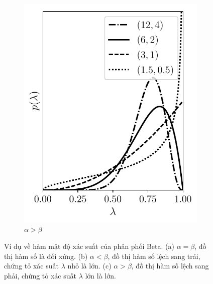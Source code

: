 \begin{figure}[t]
\begin{subfigure}{0.325\textwidth}
    \includegraphics[width=0.99\linewidth]{Chapters/02_LinearAlgebra/30_prob/python/beta3.pdf}
    \caption{$\alpha > \beta$}
    \label{fig:30_3c}
    \end{subfigure}
    \caption{
    Ví dụ về hàm mật độ xác suất của phân phối Beta. (a) $\alpha = \beta$, đồ thị
    hàm số là đối xứng. (b) $\alpha < \beta$, đồ thị hàm số lệch sang trái, chứng tỏ xác suất $\lambda$ nhỏ là lớn. (c) $\alpha > \beta$, đồ thị hàm số lệch sang phải, chứng tỏ xác suất $\lambda$ lớn là lớn.
    }
    \label{fig:30_3}
\end{figure}

